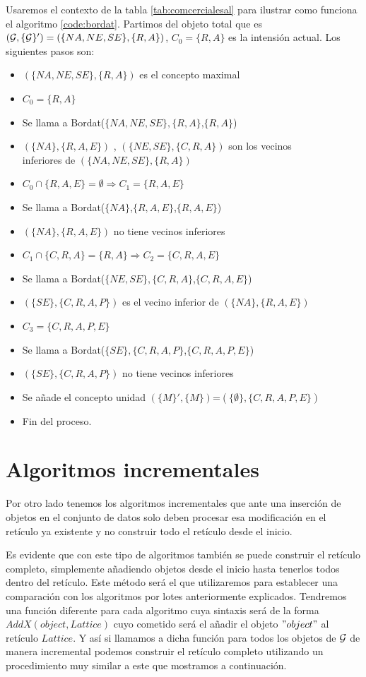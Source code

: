 \documentclass[oneside,openright,titlepage,numbers=noenddot,openany,headinclude,footinclude=true,
cleardoublepage=empty,abstractoff,BCOR=5mm,paper=a4,fontsize=12pt,main=spanish]{scrreprt}
\begin{document}
Usaremos el contexto de la tabla \ref{tab:comcercialesal} para ilustrar como funciona el algoritmo \ref{code:bordat}. Partimos del objeto total que es $(\mathcal{G},\{\mathcal{G}\}')=(\{NA,NE,SE\},\{R,A\})$, $C_0=\{R,A\}$ es la intensión actual. Los siguientes pasos son:

\begin{itemize}
    \item $(\{NA,NE,SE\},\{R,A\})$ es el concepto maximal
    \item $C_0=\{R,A\}$
    \item Se llama a Bordat($\{NA,NE,SE\},\{R,A\}$,$\{R,A\}$)
    \item $(\{NA\},\{R,A,E\})$ , $(\{NE,SE\},\{C,R,A\})$ son los vecinos\\
    inferiores de $(\{NA,NE,SE\},\{R,A\})$
    \item $C_0 \cap \{R,A,E\} =\emptyset \Longrightarrow C_1 =\{R,A,E\}$
    \item Se llama a Bordat($\{NA\}$,$\{R,A,E\}$,$\{R,A,E\}$)
    \item $(\{NA\},\{R,A,E\})$ no tiene vecinos inferiores
    \item $C_1 \cap \{C,R,A\}= \{R,A\} \Longrightarrow C_2 = \{C,R,A,E\}$
    \item Se llama a Bordat($\{NE,SE\},\{C,R,A\}$,$\{C,R,A,E\}$)
    \item $(\{SE\},\{C,R,A,P\})$ es el vecino inferior de $(\{NA\},\{R,A,E\})$
    \item $C_3=\{C,R,A,P,E\}$
    \item Se llama a Bordat($\{SE\},\{C,R,A,P\}$,$\{C,R,A,P,E\}$)
    \item $(\{SE\},\{C,R,A,P\})$ no tiene vecinos inferiores
    \item Se añade el concepto unidad $(\{M\}',\{M\})$=$(\{\emptyset\},\{C,R,A,P,E\})$
    \item Fin del proceso.
\end{itemize}

\section{Algoritmos incrementales}

Por otro lado tenemos los algoritmos incrementales que ante una inserción de objetos en el conjunto de datos solo deben procesar esa modificación en el retículo ya existente y no construir todo el retículo desde el inicio.

Es evidente que con este tipo de algoritmos también se puede construir el retículo completo, simplemente añadiendo objetos desde el inicio hasta tenerlos todos dentro del retículo. Este método será el que utilizaremos para establecer una comparación con los algoritmos por lotes anteriormente explicados. Tendremos una función diferente para cada algoritmo cuya sintaxis será de la forma $AddX(object,Lattice)$ cuyo cometido será el añadir el objeto $"object"$ al retículo $Lattice$. Y así si llamamos a dicha función para todos los objetos de $\mathcal{G}$ de manera incremental podemos construir el retículo completo utilizando un procedimiento muy similar a este que mostramos a continuación.
\end{document}
